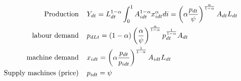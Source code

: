 \begin{align*}
\text{Production}\hspace{4mm} & Y_{dt}=L^{1-\alpha}_{dt}\int_{0}^{1}A^{1-\alpha}_{idt}x_{idt}^{\alpha}di=  \left(\alpha\frac{p_{dt}}{\psi}\right)^{\frac{\alpha}{1-\alpha}}A_{dt} L_{dt} \\ 
\text{labour demand}\hspace{4mm} & p_{dLt} =
(1-\alpha)\left(\frac{\alpha}{\psi}\right)^\frac{\alpha}{1- \alpha}p_{dt}^\frac{1}{1-\alpha}A_{dt}\\
\text{machine demand}\hspace{4mm} & x_{idt} = \left(\alpha\frac{ p_{dt}}{p_{idt}}\right)^\frac{1}{1-\alpha}A_{idt}L_{dt}\\
\text{Supply machines (price)}\hspace{4mm}& p_{idt}=\psi
\end{align*}

